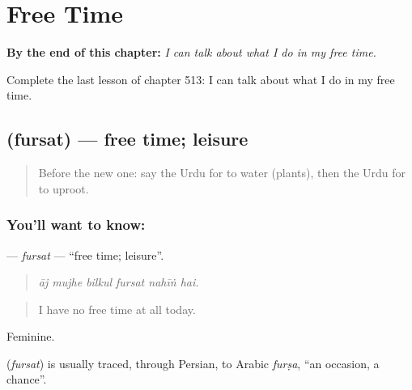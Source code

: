 
\chapter{Free Time}
\label{ch:ur-free-time}

\begin{chapteropening}
\textbf{By the end of this chapter:} \emph{I can talk about what I do in my free time.}

Complete the last lesson of chapter 513: I can talk about what I do in my free time.
\end{chapteropening}

\section[\texorpdfstring{\ur{فرصت} (fursat)}{فرصت (fursat)}]{ (fursat) — free time; leisure}

\label{lesson:UR-C513-fursat}



\begin{quote}
Before the new one: say the Urdu for to water (plants), then the Urdu for to uproot.
\end{quote}

\subsection*{You'll want to know: }
\textbf{} — \emph{fursat} — \textquotedblleft{}free time; leisure\textquotedblright{}.

\begin{quote}
     
\end{quote}

\begin{quote}
\emph{āj mujhe bilkul fursat nahīṅ hai.}
\end{quote}

\begin{quote}
I have no free time at all today.
\end{quote}

Feminine.

\begin{cousinweb}
\textbf{} (\emph{fursat}) is usually traced, through Persian, to Arabic \emph{furṣa}, \textquotedblleft{}an occasion, a chance\textquotedblright{}.
\end{cousinweb}

